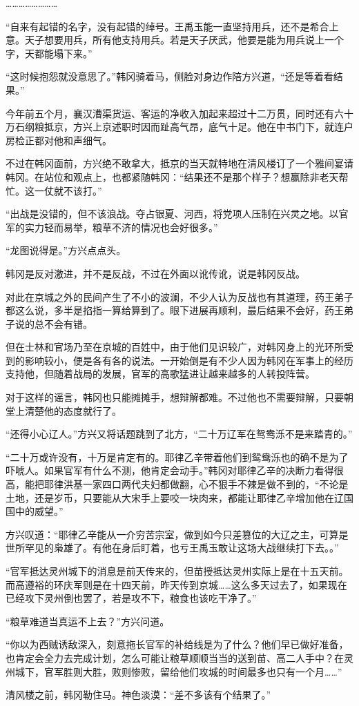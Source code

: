 ……………………

“自来有起错的名字，没有起错的绰号。王禹玉能一直坚持用兵，还不是希合上意。天子想要用兵，所有他支持用兵。若是天子厌武，他要是能为用兵说上一个字，天都能塌下来。”

“这时候抱怨就没意思了。”韩冈骑着马，侧脸对身边作陪方兴道，“还是等着看结果。”

今年前五个月，襄汉漕渠货运、客运的净收入加起来超过十二万贯，同时还有六十万石纲粮抵京，方兴上京述职时因而趾高气昂，底气十足。他在中书门下，就连户房检正都对他和声细气。

不过在韩冈面前，方兴绝不敢拿大，抵京的当天就特地在清风楼订了一个雅间宴请韩冈。在站位和观点上，也都紧随韩冈：“结果还不是那个样子？想赢除非老天帮忙。这一仗就不该打。”

“出战是没错的，但不该浪战。夺占银夏、河西，将党项人压制在兴灵之地。以官军的实力轻而易举，粮草不济的情况也会好很多。”

“龙图说得是。”方兴点点头。

韩冈是反对激进，并不是反战，不过在外面以讹传讹，说是韩冈反战。

对此在京城之外的民间产生了不小的波澜，不少人认为反战也有其道理，药王弟子都这么说，多半是掐指一算给算到了。眼下进展再顺利，最后结果不会好，药王弟子说的总不会有错。

但在士林和官场乃至在京城的百姓中，由于他们见识较广，对韩冈身上的光环所受到的影响较小，便是各有各的说法。一开始倒是有不少人因为韩冈在军事上的经历支持他，但随着战局的发展，官军的高歌猛进让越来越多的人转投阵营。

对于这样的谣言，韩冈也只能摊摊手，想辩解都难。不过他也不需要辩解，只要朝堂上清楚他的态度就行了。

“还得小心辽人。”方兴又将话题跳到了北方，“二十万辽军在鸳鸯泺不是来踏青的。”

“二十万或许没有，十万是肯定有的。耶律乙辛带着他们到鸳鸯泺也的确不是为了吓唬人。如果官军有什么不测，他肯定会动手。”韩冈对耶律乙辛的决断力看得很高，能把耶律洪基一家四口两代夫妇都做翻，心不狠手不辣是做不到的，“不论是土地，还是岁币，只要能从大宋手上要咬一块肉来，都能让耶律乙辛增加他在辽国国中的威望。”

方兴叹道：“耶律乙辛能从一介穷苦宗室，做到如今只差篡位的大辽之主，可算是世所罕见的枭雄了。有他在身后盯着，也亏王禹玉敢让这场大战继续打下去。。”

“官军抵达灵州城下的消息是前天传来的，但苗授抵达灵州实际上是在十五天前。而高遵裕的环庆军则是在十四天前，昨天传到京城……这么多天过去了，如果现在已经攻下灵州倒也罢了，若是攻不下，粮食也该吃干净了。”

“粮草难道当真运不上去？”方兴问道。

“你以为西贼诱敌深入，刻意拖长官军的补给线是为了什么？他们早已做好准备，也肯定会全力去完成计划，怎么可能让粮草顺顺当当的送到苗、高二人手中？在灵州城下，官军胜则大胜，败则惨败，留给他们攻城的时间最多也只有一个月……”

清风楼之前，韩冈勒住马。神色淡漠：“差不多该有个结果了。”

